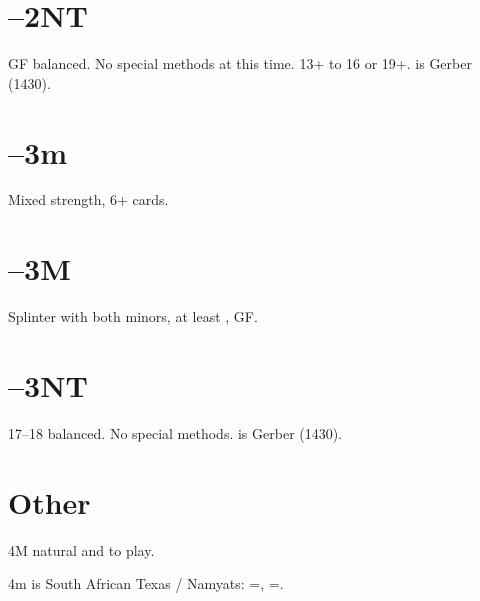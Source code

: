 \documentclass[tom-jenni]{subfiles}
\begin{document}
\section[1D--2NT]{--2NT}

GF balanced. No special methods at this time. 13+ to 16 or 19+.   is Gerber (1430).

\section[1D--3m]{--3m}

Mixed strength, 6+ cards.

\section[1D--3M]{--3M}

Splinter with both minors, at least , GF.

\section[1D--3NT]{--3NT}

17--18 balanced. No special methods.  is Gerber (1430).

\section{Other}

4M natural and to play.

4m is South African Texas / Namyats:  =\hhh, =\sss.   
\end{document}
